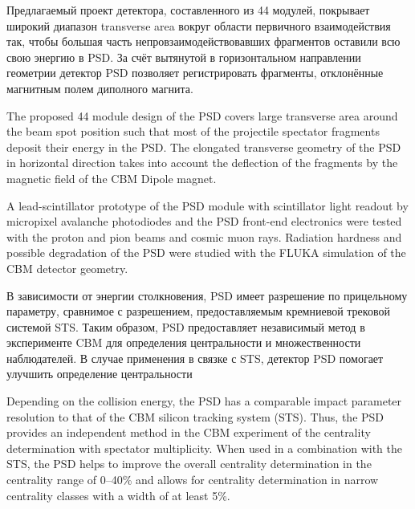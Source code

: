 

Предлагаемый проект детектора, составленного из 44 модулей, покрывает широкий диапазон transverse area \todo вокруг области первичного взаимодействия так, чтобы большая часть непровзаимодействовавших фрагментов оставили всю свою энергию в PSD. За счёт вытянутой в горизонтальном направлении геометрии детектор PSD позволяет регистрировать фрагменты, отклонённые магнитным полем диполного магнита.

The proposed 44 module design of the PSD covers large transverse area around the beam spot position such that most of the projectile spectator fragments deposit their energy in the PSD. The elongated transverse geometry of the PSD in horizontal direction takes into account the deflection of the fragments by the magnetic field of the CBM Dipole magnet.

A lead-scintillator prototype of the PSD module with scintillator light readout by micropixel avalanche
photodiodes and the PSD front-end electronics were tested with the proton and pion beams and cosmic
muon rays.   Radiation hardness and possible degradation of the PSD were studied with the FLUKA
simulation of the CBM detector geometry.

В зависимости от энергии столкновения, PSD имеет разрешение по прицельному параметру, сравнимое с разрешением, предоставляемым кремниевой трековой системой STS. Таким образом, PSD предоставляет независимый метод в эксперименте CBM для определения центральности и множественности наблюдателей. В случае применения в связке с STS, детектор PSD помогает улучшить определение центральности 

Depending on the collision energy, the PSD has a comparable impact parameter resolution to that of the CBM
silicon tracking system (STS). Thus, the PSD provides an independent method in the CBM experiment of the
centrality determination with spectator multiplicity. When used in a combination with the STS, the
PSD helps to improve the overall centrality determination in the centrality range of 0--40\% and allows
for centrality determination in narrow centrality classes with a width of at least 5\%.

